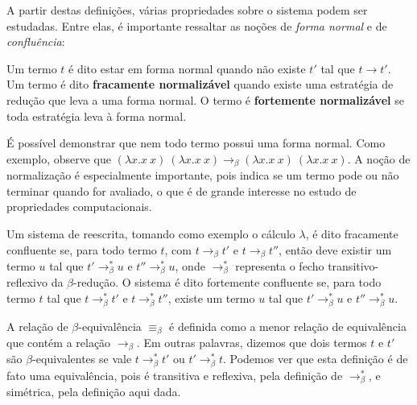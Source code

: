 A partir destas definições, várias propriedades sobre o sistema podem ser
estudadas. Entre elas, é importante ressaltar as noções de \textit{forma
 normal} e de \textit{confluência}:

\begin{definicao}\label{def_normal}
    Um termo $t$ é dito estar em forma normal quando não existe $t'$ tal que $ t
    \rightarrow t' $.  Um termo é dito \textbf{fracamente normalizável} quando
    existe uma estratégia de redução que leva a uma forma normal. O termo é
    \textbf{fortemente normalizável} se toda estratégia leva à forma normal.
\end{definicao}

É possível demonstrar que nem todo termo possui uma forma normal. Como exemplo,
observe que $ (\lambda x.x\ x)\ (\lambda x.x\ x) \rightarrow_\beta (\lambda x.x\
x)\ (\lambda x.x\ x) $. A noção de normalização é especialmente importante, pois
indica se um termo pode ou não terminar quando for avaliado, o que é de grande
interesse no estudo de propriedades computacionais.

\begin{definicao}[Confluência]
    Um sistema de reescrita, tomando como exemplo o cálculo $\lambda$, é dito
    fracamente confluente se, para todo termo $t$, com $ t \rightarrow_\beta t' $
    e $ t \rightarrow_\beta t'' $, então deve existir um termo $u$ tal que $t'
    \rightarrow_\beta^* u$ e $t'' \rightarrow_\beta^* u$, onde
    $\rightarrow_\beta^*$ representa o fecho transitivo-reflexivo da
    $\beta$-redução.  O sistema é dito fortemente confluente se, para todo termo
    $t$ tal que $ t \rightarrow_\beta^* t' $ e $ t \rightarrow_\beta^* t'' $,
    existe um termo $u$ tal que $t' \rightarrow_\beta^* u$ e $t''
    \rightarrow_\beta^* u$. 
\end{definicao}

\begin{definicao}
    A relação de $\beta$-equivalência $\equiv_{\beta}$ é definida como a menor
    relação de equivalência que contém a relação $\rightarrow_{\beta}$. Em
    outras palavras, dizemos que dois termos $t$ e $t'$ são $\beta$-equivalentes
    se vale $t \rightarrow_{\beta}^* t'$ ou $t' \rightarrow_{\beta}^* t$.
    Podemos ver que esta definição é de fato uma equivalência, pois é transitiva
    e reflexiva, pela definição de $\rightarrow_{\beta}^*$, e simétrica, pela
    definição aqui dada.
\end{definicao}

